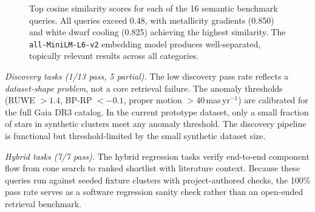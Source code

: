 \documentclass[preprint,12pt,authoryear]{elsarticle}
\begin{document}
\begin{figure}[htbp]
\centering
{}
\caption{\label{fig:semantic_sim}Top cosine similarity scores for each of the 16 semantic benchmark queries. All queries exceed 0.48, with metallicity gradients (0.850) and white dwarf cooling (0.825) achieving the highest similarity. The \texttt{all-MiniLM-L6-v2} embedding model produces well-separated, topically relevant results across all categories.}
\end{figure}

\textit{Discovery tasks (1/13 pass, 5 partial).} The low discovery pass rate reflects a \emph{dataset-shape problem}, not a core retrieval failure. The anomaly thresholds (RUWE $>1.4$, BP-RP $< -0.1$, proper motion $>40$\,mas\,yr$^{-1}$) are calibrated for the full Gaia DR3 catalog. In the current prototype dataset, only a small fraction of stars in synthetic clusters meet any anomaly threshold. The discovery pipeline is functional but threshold-limited by the small synthetic dataset size.

\textit{Hybrid tasks (7/7 pass).} The hybrid regression tasks verify end-to-end component flow from cone search to ranked shortlist with literature context. Because these queries run against seeded fixture clusters with project-authored checks, the 100\% pass rate serves as a software regression sanity check rather than an open-ended retrieval benchmark.
\end{document}
